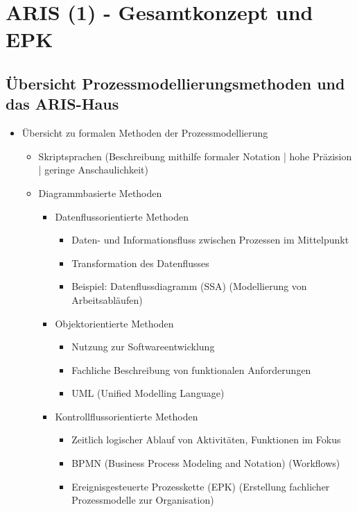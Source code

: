 \section{ARIS (1) - Gesamtkonzept und EPK}
\subsection{Übersicht Prozessmodellierungsmethoden und das ARIS-Haus}
\begin{itemize}

	\item Übersicht zu formalen Methoden der Prozessmodellierung
		\begin{itemize}
		\item Skriptsprachen (Beschreibung mithilfe formaler Notation | hohe Präzision | geringe Anschaulichkeit)	
		\item Diagrammbasierte Methoden
			\begin{itemize}
			\item Datenflussorientierte Methoden
				\begin{itemize}
				\item Daten- und Informationsfluss zwischen Prozessen im Mittelpunkt
				\item Transformation des Datenflusses
				\item Beispiel: Datenflussdiagramm (SSA) (Modellierung von Arbeitsabläufen)
				\end{itemize}
			
			\item Objektorientierte Methoden
				\begin{itemize}
				\item Nutzung zur Softwareentwicklung
				\item Fachliche Beschreibung von funktionalen Anforderungen
				\item UML (Unified Modelling Language)
				\end{itemize}
				
			\item Kontrollflussorientierte Methoden
				\begin{itemize}
				\item Zeitlich logischer Ablauf von Aktivitäten, Funktionen im Fokus
				\item BPMN (Business Process Modeling and Notation) (Workflows)
				\item Ereignisgesteuerte Prozesskette (EPK) (Erstellung fachlicher Prozessmodelle zur Organisation)
				\end{itemize}							
			

\end{itemize}
\end{itemize}
\end{itemize}
